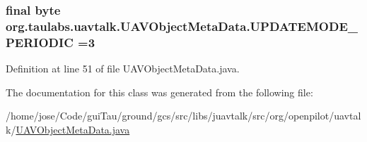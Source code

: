 \hypertarget{classorg_1_1taulabs_1_1uavtalk_1_1_u_a_v_object_meta_data_a0de23ed97539abcf565c1fdc46d47f80}{
\subsubsection[{U\-P\-D\-A\-T\-E\-M\-O\-D\-E\-\_\-\-P\-E\-R\-I\-O\-D\-I\-C}]{\setlength{\rightskip}{0pt plus 5cm}final byte org.\-taulabs.\-uavtalk.\-U\-A\-V\-Object\-Meta\-Data.\-U\-P\-D\-A\-T\-E\-M\-O\-D\-E\-\_\-\-P\-E\-R\-I\-O\-D\-I\-C =3\hspace{0.3cm}{\ttfamily [static]}}}\label{classorg_1_1taulabs_1_1uavtalk_1_1_u_a_v_object_meta_data_a0de23ed97539abcf565c1fdc46d47f80}


Definition at line 51 of file U\-A\-V\-Object\-Meta\-Data.\-java.



The documentation for this class was generated from the following file\-:\begin{DoxyCompactItemize}
\item 
/home/jose/\-Code/gui\-Tau/ground/gcs/src/libs/juavtalk/src/org/openpilot/uavtalk/\hyperlink{_u_a_v_object_meta_data_8java}{U\-A\-V\-Object\-Meta\-Data.\-java}\end{DoxyCompactItemize}
